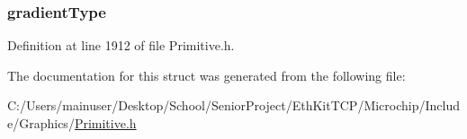 \subsubsection[{gradient\+Type}]{ gradient\+Type}\label{struct_g_f_x___g_r_a_d_i_e_n_t___s_t_y_l_e_a385df9969778859af3352c401ec1f261}


Definition at line 1912 of file Primitive.\+h.



The documentation for this struct was generated from the following file\+:\begin{DoxyCompactItemize}
\item 
C\+:/\+Users/mainuser/\+Desktop/\+School/\+Senior\+Project/\+Eth\+Kit\+T\+C\+P/\+Microchip/\+Include/\+Graphics/\hyperlink{_primitive_8h}{Primitive.\+h}\end{DoxyCompactItemize}

